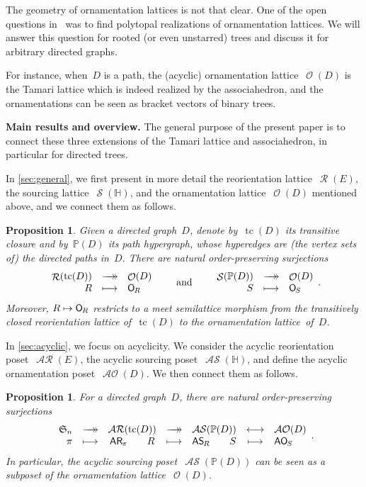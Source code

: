 \documentclass{amsart}
\newtheorem{proposition}[theorem]{Proposition}
\theoremstyle{definition}
\renewcommand{\c}[1]{\mathcal{#1}} %
\newcommand{\surjection}{\longrightarrow\mathrel{\mkern-22mu}\rightarrow\,}
\newcommand{\bijection}{\longleftrightarrow}
\DeclareMathOperator{\tc}{tc} %
\newcommand{\para}[1]{\bigskip\noindent\textbf{#1}} %
\newcommand{\fS}{\mathfrak{S}} %
\newcommand{\mymap}[2]{\mathsf{#1}_{\hspace{-.7pt}#2}}
\DeclareMathOperator{\Orn}{\c{O}}  %
\newcommand{\orn}[1]{\mymap{O}{#1}}  %
\DeclareMathOperator{\AOrn}{\c{AO}}  %
\newcommand{\aorn}[1]{\mymap{AO}{#1}}  %
\DeclareMathOperator{\Reori}{\c{R}}  %
\DeclareMathOperator{\AReori}{\c{AR}}  %
\newcommand{\areori}[1]{\mymap{AR}{#1}}  %
\DeclareMathOperator{\Sour}{\mathcal{S}}  %
\DeclareMathOperator{\ASour}{\mathcal{AS}}  %
\newcommand{\asour}[1]{\mymap{AS}{#1}}  %
\newcommand{\HH}{\mathbb H}  %
\newcommand{\PP}{\mathbb P} %
\begin{document}
The geometry of ornamentation lattices is not that clear.
One of the open questions in~\cite{DefantSack} was to find polytopal realizations of ornamentation lattices.
We will answer this question for rooted (or even unstarred) trees and discuss it for arbitrary directed graphs.

For instance, when~$D$ is a path, the (acyclic) ornamentation lattice~$\Orn(D)$ is the Tamari lattice which is indeed realized by the associahedron, and the ornamentations can be seen as bracket vectors of binary trees.


\medskip
\para{Main results and overview.}
The general purpose of the present paper is to connect these three extensions of the Tamari lattice and associahedron, in particular for directed trees.

In \cref{sec:general}, we first present in more detail the reorientation lattice~$\Reori(E)$, the sourcing lattice~$\Sour(\HH)$, and the ornamentation lattice~$\Orn(D)$ mentioned above, and we connect them as \linebreak follows.

\begin{proposition}
Given a directed graph~$D$, denote by~$\tc(D)$ its transitive closure and by~$\PP(D)$ its path hypergraph, whose hyperedges are (the vertex sets of) the directed paths in~$D$.
There are natural order-preserving surjections
\[
\begin{array}{rcl}
	\Reori(\tc(D)) & \surjection & \Orn(D) \\
	R & \longmapsto & \orn{R}
\end{array}
\qquad\text{and}\qquad
\begin{array}{rcl}
	\Sour(\PP(D)) & \surjection & \Orn(D) \\
	S & \longmapsto & \orn{S}
\end{array}
.
\]
Moreover, $R \mapsto \orn{R}$ restricts to a meet semilattice morphism from the transitively closed reorientation lattice of~$\tc(D)$ to the ornamentation lattice~of~$D$.
\end{proposition}

In \cref{sec:acyclic}, we focus on acyclicity.
We consider the acyclic reorientation poset~$\AReori(E)$, the acyclic sourcing poset~$\ASour(\HH)$, and define the acyclic ornamentation poset~$\AOrn(D)$. We then connect them as follows.

\begin{proposition}
For a directed graph~$D$, there are natural order-preserving surjections
\[
\begin{array}{rcccccl}
	\fS_n & \surjection & \AReori(\tc(D)) & \surjection & \ASour(\PP(D)) & \bijection & \AOrn(D) \\
	\pi & \longmapsto & \areori{\pi} \qquad R & \longmapsto & \asour{R} \qquad S & \longmapsto & \aorn{S}
\end{array}
.
\]
In particular, the acyclic sourcing poset~$\ASour(\PP(D))$ can be seen as a subposet of the ornamentation lattice~$\Orn(D)$.
\end{proposition}
\end{document}
